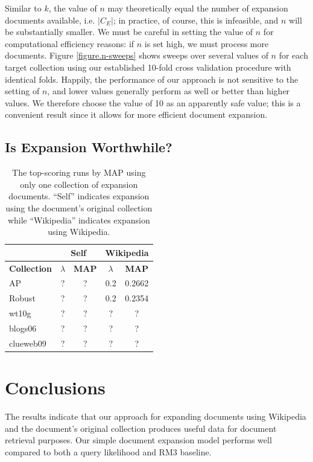 \documentclass{article}
\begin{document}
Similar to $k$, the value of $n$ may theoretically equal the number of expansion documents available, i.e. $|C_E|$; in practice, of course, this is infeasible, and $n$ will be substantially smaller. We must be careful in setting the value of $n$ for computational efficiency reasons: if $n$ is set high, we must process more documents. Figure \ref{figure.n-sweeps} shows sweeps over several values of $n$ for each target collection using our established 10-fold cross validation procedure with identical folds. Happily, the performance of our approach is not sensitive to the setting of $n$, and lower values generally perform as well or better than higher values. We therefore choose the value of 10 as an apparently safe value; this is a convenient result since it allows for more efficient document expansion.

\subsection{Is Expansion Worthwhile?}\label{section.results.expansion}

\begin{table}[htbp]
\centering
\begin{tabular}{|l|c|c|c|c|} \hline
& \multicolumn{2}{c}{Self} & \multicolumn{2}{|c|}{Wikipedia} \\ \hline
{\bf Collection} & {\bf $\lambda$} & {\bf MAP} & {\bf $\lambda$} & {\bf MAP} \\ \hline
AP & ? & ? & 0.2 & 0.2662 \\ \hline
Robust & ? & ? & 0.2 & 0.2354 \\ \hline
wt10g & ? & ? & ? & ? \\ \hline
blogs06 & ? & ? & ? & ? \\ \hline
clueweb09 & ? & ? & ? & ? \\ \hline
\end{tabular}
\caption{The top-scoring runs by MAP using only one collection of expansion documents. ``Self'' indicates expansion using the document's original collection while ``Wikipedia'' indicates expansion using Wikipedia.}
\label{table.performance.single}
\end{table}

\section{Conclusions}\label{section.conclusions}

The results indicate that our approach for expanding documents using Wikipedia and the document's original collection produces useful data for document retrieval purposes. Our simple document expansion model performs well compared to both a query likelihood and RM3 baseline.
\end{document}
